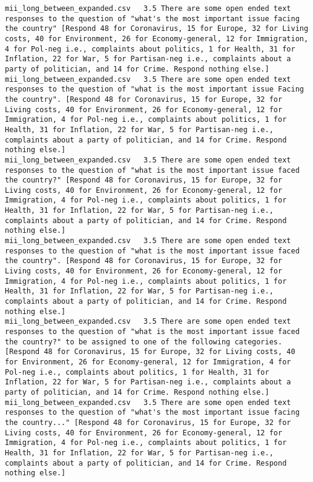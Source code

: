\begin{lstlisting}[label=lst:promptvariants]
mii_long_between_expanded.csv	3.5	There are some open ended text responses to the question of "what's the most important issue facing the country" [Respond 48 for Coronavirus, 15 for Europe, 32 for Living costs, 40 for Environment, 26 for Economy-general, 12 for Immigration, 4 for Pol-neg i.e., complaints about politics, 1 for Health, 31 for Inflation, 22 for War, 5 for Partisan-neg i.e., complaints about a party of politician, and 14 for Crime. Respond nothing else.]
mii_long_between_expanded.csv	3.5	There are some open ended text responses to the question of "what is the most important issue Facing the country". [Respond 48 for Coronavirus, 15 for Europe, 32 for Living costs, 40 for Environment, 26 for Economy-general, 12 for Immigration, 4 for Pol-neg i.e., complaints about politics, 1 for Health, 31 for Inflation, 22 for War, 5 for Partisan-neg i.e., complaints about a party of politician, and 14 for Crime. Respond nothing else.]
mii_long_between_expanded.csv	3.5	There are some open ended text responses to the question of "what is the most important issue faced the country?" [Respond 48 for Coronavirus, 15 for Europe, 32 for Living costs, 40 for Environment, 26 for Economy-general, 12 for Immigration, 4 for Pol-neg i.e., complaints about politics, 1 for Health, 31 for Inflation, 22 for War, 5 for Partisan-neg i.e., complaints about a party of politician, and 14 for Crime. Respond nothing else.]
mii_long_between_expanded.csv	3.5	There are some open ended text responses to the question of "what is the most important issue faced the country". [Respond 48 for Coronavirus, 15 for Europe, 32 for Living costs, 40 for Environment, 26 for Economy-general, 12 for Immigration, 4 for Pol-neg i.e., complaints about politics, 1 for Health, 31 for Inflation, 22 for War, 5 for Partisan-neg i.e., complaints about a party of politician, and 14 for Crime. Respond nothing else.]
mii_long_between_expanded.csv	3.5	There are some open ended text responses to the question of "what is the most important issue faced the country?" to be assigned to one of the following categories. [Respond 48 for Coronavirus, 15 for Europe, 32 for Living costs, 40 for Environment, 26 for Economy-general, 12 for Immigration, 4 for Pol-neg i.e., complaints about politics, 1 for Health, 31 for Inflation, 22 for War, 5 for Partisan-neg i.e., complaints about a party of politician, and 14 for Crime. Respond nothing else.]
mii_long_between_expanded.csv	3.5	There are some open ended text responses to the question of "what's the most important issue facing the country..." [Respond 48 for Coronavirus, 15 for Europe, 32 for Living costs, 40 for Environment, 26 for Economy-general, 12 for Immigration, 4 for Pol-neg i.e., complaints about politics, 1 for Health, 31 for Inflation, 22 for War, 5 for Partisan-neg i.e., complaints about a party of politician, and 14 for Crime. Respond nothing else.]

\end{lstlisting}
